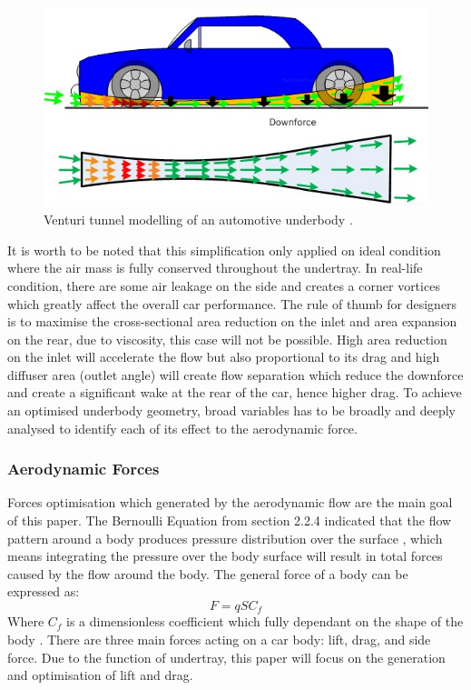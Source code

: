 \begin{figure}[!ht]
    \centering
    \includegraphics[scale=0.8]{Figures/venturi_tunnel.jpg}
    \caption{Venturi tunnel modelling of an automotive underbody \cite{Anonymous2020RaceDesign}.}
    \label{fig:venturi_tunnel_car}
\end{figure}
\noindent It is worth to be noted that this simplification only applied on ideal condition where the air mass is fully conserved throughout the undertray. In real-life condition, there are some air leakage on the side and creates a corner vortices which greatly affect the overall car performance. The rule of thumb for designers is to maximise the cross-sectional area reduction on the inlet and area expansion on the rear, due to viscosity, this case will not be possible. High area reduction on the inlet will accelerate the flow but also proportional to its drag and high diffuser area (outlet angle) will create flow separation which reduce the downforce and create a significant wake at the rear of the car, hence higher drag. To achieve an optimised underbody geometry, broad variables has to be broadly and deeply analysed to identify each of its effect to the aerodynamic force.


\subsubsection{Aerodynamic Forces}
Forces optimisation which generated by the aerodynamic flow are the main goal of this paper. The Bernoulli Equation from section 2.2.4 indicated that the flow pattern around a body produces pressure distribution over the surface \cite{Scibor-Rylski1984RoadAerodynamics}, which means integrating the pressure over the body surface will result in total forces caused by the flow around the body. The general force of a body can be expressed as:
\begin{equation}
    F = qSC_f
\end{equation}
Where $C_f$ is a dimensionless coefficient which fully dependant on the shape of the body \cite{Scibor-Rylski1984RoadAerodynamics}. There are three main forces acting on a car body: lift, drag, and side force. Due to the function of undertray, this paper will focus on the generation and optimisation of lift and drag.

